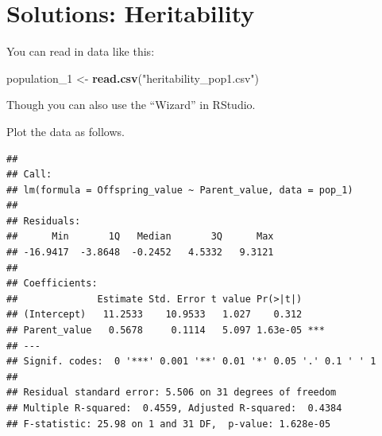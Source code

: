\documentclass[
  a4paper]{book}
\newenvironment{Shaded}{\begin{snugshade}}{\end{snugshade}}
\newcommand{\AttributeTok}[1]{\textcolor[rgb]{0.13,0.29,0.53}{#1}}
\newcommand{\CommentTok}[1]{\textcolor[rgb]{0.56,0.35,0.01}{\textit{#1}}}
\newcommand{\FunctionTok}[1]{\textcolor[rgb]{0.13,0.29,0.53}{\textbf{#1}}}
\newcommand{\NormalTok}[1]{#1}
\newcommand{\OtherTok}[1]{\textcolor[rgb]{0.56,0.35,0.01}{#1}}
\newcommand{\SpecialCharTok}[1]{\textcolor[rgb]{0.81,0.36,0.00}{\textbf{#1}}}
\newcommand{\StringTok}[1]{\textcolor[rgb]{0.31,0.60,0.02}{#1}}
\begin{document}
\section{Solutions: Heritability}\label{solutions-heritability}

You can read in data like this:

\begin{Shaded}
\begin{Highlighting}[]
\NormalTok{population\_1 }\OtherTok{\textless{}{-}} \FunctionTok{read.csv}\NormalTok{(}\StringTok{"heritability\_pop1.csv"}\NormalTok{)}
\end{Highlighting}
\end{Shaded}

Though you can also use the ``Wizard'' in RStudio.

Plot the data as follows.

\begin{Shaded}
\end{Shaded}

\begin{verbatim}
## 
## Call:
## lm(formula = Offspring_value ~ Parent_value, data = pop_1)
## 
## Residuals:
##      Min       1Q   Median       3Q      Max 
## -16.9417  -3.8648  -0.2452   4.5332   9.3121 
## 
## Coefficients:
##              Estimate Std. Error t value Pr(>|t|)    
## (Intercept)   11.2533    10.9533   1.027    0.312    
## Parent_value   0.5678     0.1114   5.097 1.63e-05 ***
## ---
## Signif. codes:  0 '***' 0.001 '**' 0.01 '*' 0.05 '.' 0.1 ' ' 1
## 
## Residual standard error: 5.506 on 31 degrees of freedom
## Multiple R-squared:  0.4559, Adjusted R-squared:  0.4384 
## F-statistic: 25.98 on 1 and 31 DF,  p-value: 1.628e-05
\end{verbatim}
\end{document}
